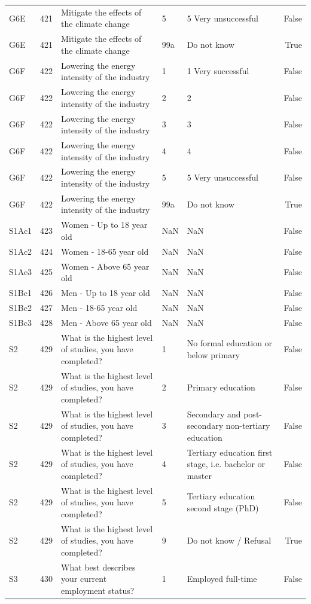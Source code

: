 \begin{tabular}{lrlllr}
G6E & 421 & Mitigate the effects of the climate change & 5 & 5 Very unsuccessful & False \\
G6E & 421 & Mitigate the effects of the climate change & 99a & Do not know & True \\
G6F & 422 & Lowering the energy intensity of the industry & 1 & 1 Very successful & False \\
G6F & 422 & Lowering the energy intensity of the industry & 2 & 2 & False \\
G6F & 422 & Lowering the energy intensity of the industry & 3 & 3 & False \\
G6F & 422 & Lowering the energy intensity of the industry & 4 & 4 & False \\
G6F & 422 & Lowering the energy intensity of the industry & 5 & 5 Very unsuccessful & False \\
G6F & 422 & Lowering the energy intensity of the industry & 99a & Do not know & True \\
S1Ac1 & 423 & Women - Up to 18 year old & NaN & NaN & False \\
S1Ac2 & 424 & Women - 18-65 year old & NaN & NaN & False \\
S1Ac3 & 425 & Women - Above 65 year old & NaN & NaN & False \\
S1Bc1 & 426 & Men - Up to 18 year old & NaN & NaN & False \\
S1Bc2 & 427 & Men - 18-65 year old & NaN & NaN & False \\
S1Bc3 & 428 & Men - Above 65 year old & NaN & NaN & False \\
S2 & 429 & What is the highest level of studies, you have completed? & 1 & No formal education or below primary & False \\
S2 & 429 & What is the highest level of studies, you have completed? & 2 & Primary education & False \\
S2 & 429 & What is the highest level of studies, you have completed? & 3 & Secondary  and post-secondary non-tertiary education & False \\
S2 & 429 & What is the highest level of studies, you have completed? & 4 & Tertiary education first stage, i.e. bachelor or master & False \\
S2 & 429 & What is the highest level of studies, you have completed? & 5 & Tertiary education second stage (PhD) & False \\
S2 & 429 & What is the highest level of studies, you have completed? & 9 & Do not know / Refusal & True \\
S3 & 430 & What best describes your current employment status? & 1 & Employed full-time & False \\

\end{tabular}
